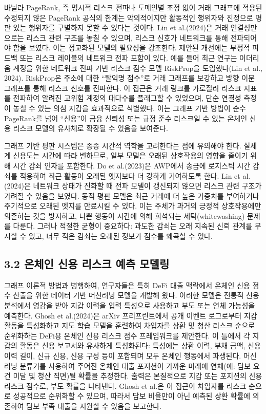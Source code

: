 바닐라 PageRank, 즉 명시적 리스크 전파나 도메인별 조정 없이 거래 그래프에 적용된 수정되지 않은 PageRank 공식의 한계는 악의적이지만 활동적인 행위자와 진정으로 평판 있는 행위자를 구별하지 못할 수 있다는 것이다. Lin et al.(2024)은 거래 연결성만으로는 리스크 관련 구조를 놓칠 수 있으며, 리스크 신호가 네트워크를 통해 전파되어야 함을 보였다. 이는 정교화된 모델의 필요성을 강조한다. 제안된 개선에는 부정적 피드백 또는 리스크 레이블의 네트워크 전파 포함이 있다. 예를 들어 최근 연구는 이더리움 계정을 위한 네트워크 전파 기반 리스크 점수 모델 RiskProp을 도입했다(Lin et al., 2024). RiskProp은 주소에 대한 ``탈익명 점수''로 거래 그래프를 보강하고 방향 이분 그래프를 통해 리스크 신호를 전파한다. 이 접근은 거래 링크를 가로질러 리스크 지표를 전파하여 알려진 고위험 계정의 대다수를 플래그할 수 있었으며, 단순 연결성 측정이 놓칠 수 있는 의심 지갑을 효과적으로 식별했다. 이는 그래프 기반 방법이 순수 PageRank를 넘어 ``신용''이 금융 신뢰성 또는 규정 준수 리스크일 수 있는 온체인 신용 리스크 모델의 유사체로 확장될 수 있음을 보여준다.


그래프 기반 평판 시스템은 종종 시간적 역학을 고려한다는 점에 유의해야 한다. 실세계 신용도는 시간에 따라 변하므로, 일부 모델은 오래된 상호작용의 영향을 줄이기 위해 시간 감쇠 인자를 포함한다. Do et al.(2023)은 AWP에서 송금에 로지스틱 시간 감쇠를 적용하여 최근 활동이 오래된 엣지보다 더 강하게 기여하도록 한다. Lin et al.(2024)은 네트워크 상태가 진화할 때 전파 모델이 갱신되지 않으면 리스크 관련 구조가 가려질 수 있음을 보였다. 동적 평판 모델은 최근 거래에 더 높은 가중치를 부여하거나 주기적으로 오래된 엣지를 만료시킬 수 있다. 이는 주체가 과거의 긍정적 상호작용에만 의존하는 것을 방지하고, 나쁜 행동이 시간에 의해 희석되는 세탁(whitewashing) 문제를 다룬다. 그러나 적절한 균형이 중요하다: 과도한 감쇠는 오래 지속된 신뢰 관계를 무시할 수 있고, 너무 적은 감쇠는 오래된 정보가 점수를 왜곡할 수 있다.


\subsection*{3.2 온체인 신용 리스크 예측 모델링}
\label{sec:predictive-modeling-for-on-chain-credit-risk}

그래프 이론적 방법과 병행하여, 연구자들은 특히 DeFi 대출 맥락에서 온체인 신용 점수 산출을 위한 데이터 기반 머신러닝 모델을 개발해 왔다. 이러한 모델은 전통적 신용 분석에서 영감을 받아 지갑 이력을 입력 특성으로 사용하고 부도 또는 연체 가능성을 예측한다. Ghosh et al.(2024)은 arXiv 프리프린트에서 공개 이벤트 로그로부터 지갑 활동을 특성화하고 지도 학습 모델을 훈련하여 차입자를 상환 및 청산 리스크 순으로 순위화하는 DeFi용 온체인 신용 리스크 점수 프레임워크를 제안한다. 이 틀에서 각 지갑의 활동은 신용 보고서와 유사하게 특성화된다: 특성에는 상환 이력, 부채 금액, 신용 이력 길이, 신규 신용, 신용 구성 등이 포함되며 모두 온체인 행동에서 파생된다. 머신러닝 분류기를 사용하여 주어진 온체인 대출 포지션이 가까운 미래에 연체(예: 담보 요건 미달 및 청산 직면)될 확률을 추정한다. 출력은 본질적으로 지갑 또는 포지션의 신용 리스크 점수로, 부도 확률을 나타낸다. Ghosh et al.은 이 접근이 차입자를 리스크 순으로 성공적으로 순위화할 수 있으며, 따라서 담보 비율만이 아닌 예측된 상환 확률에 의존하여 담보 부족 대출을 지원할 수 있음을 보고한다.


